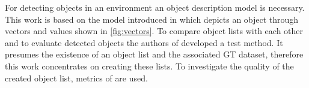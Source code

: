 For detecting objects in an environment an object description model is necessary. This work is based on the model introduced in \cite{Aeberhard} which depicts an object through vectors and values shown in \ref{fig:vectors}.
To compare object lists with each other and to evaluate detected objects the authors of \cite{Reway} developed a test method. It presumes the existence of an object list and the associated GT dataset, therefore this work concentrates on creating these lists. To investigate the quality of the created object list, metrics of \cite{Reway} are used. 